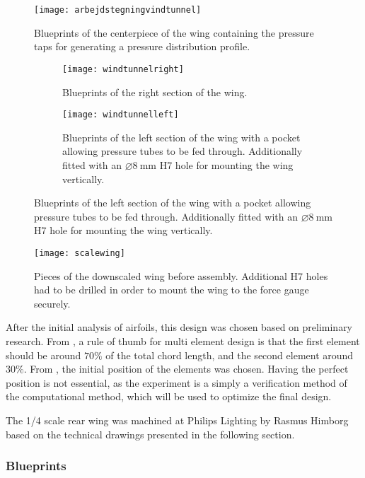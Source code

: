     \begin{figure}
      \texttt{[image: arbejdstegningvindtunnel]}
      \caption{Blueprints of the centerpiece of the wing containing the pressure taps for generating a pressure distribution profile.}
      \label{fig:scalewingblueprint}
    \end{figure}

    \begin{figure}
      \begin{subfigure}[b]{\textwidth}
        \texttt{[image: windtunnelright]}
        \caption{Blueprints of the right section of the wing.}
        \label{fig:scalewingblueprintright}
      \end{subfigure}

      \begin{subfigure}[b]{\textwidth}
        \texttt{[image: windtunnelleft]}
        \caption{Blueprints of the left section of the wing with a pocket allowing pressure tubes to be fed through. Additionally fitted with an $\diameter \SI{8}{\milli\metre}$ H7 hole for mounting the wing vertically.}
        \label{fig:scalewingblueprintleft}
      \end{subfigure}
    \end{figure}

    \begin{figure}
      \texttt{[image: scalewing]}
      \caption{Pieces of the downscaled wing before assembly. Additional H7 holes had to be drilled in order to mount the wing to the force gauge securely.}
      \label{fig:scalewingparts}
    \end{figure}

    After the initial analysis of airfoils, this design was chosen based on preliminary research. From \cite{winginitialangle}, a rule of thumb for multi element design is that the first element should be around $70\%$ of the total chord length, and the second element around $30\%$. From \cite{jkatz}, the initial position of the elements was chosen. Having the perfect position is not essential, as the experiment is a simply a verification method of the computational method, which will be used to optimize the final design.

    The 1/4 scale rear wing was machined at Philips Lighting by Rasmus Himborg based on the technical drawings presented in the following section.

    \subsubsection{Blueprints}

